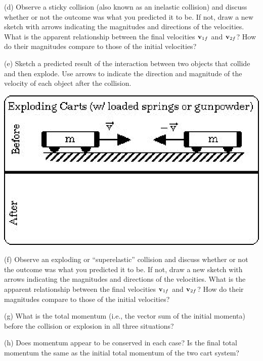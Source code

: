 (d) Observe a sticky collision (also known as an inelastic collision) and discuss
whether or not the outcome was what you predicted it to be. If not, draw a new
sketch with arrows indicating the magnitudes and directions of the velocities.
What is the apparent relationship between the final velocities \( {{\bf v}_{1f}} \)
and \( {{\bf v}_{2f}} \)? How do their magnitudes compare to those
of the initial velocities?
\vspace{20mm}

(e) Sketch a predicted result of the interaction between two objects that collide
and then explode. Use arrows to indicate the direction and magnitude of the
velocity of each object after the collision.

\vspace{0.3cm}
{\par\centering \includegraphics{mom_cons_fig5.eps} \par}
\vspace{0.3cm}

(f) Observe an exploding or ``superelastic'' collision and discuss
whether or not the outcome was what you predicted it to be. If not, draw a new
sketch with arrows indicating the magnitudes and directions of the velocities.
What is the apparent relationship between the final velocities \( {{\bf v}_{1f}} \)
and \( {{\bf v}_{2f}} \)? How do their magnitudes compare to those
of the initial velocities?
\vspace{20mm}

(g) What is the total momentum (i.e., the vector sum of the initial momenta)
before the collision or explosion in all three situations?
\vspace{20mm}

(h) Does momentum appear to be conserved in each case? Is the final total momentum
the same as the initial total momentum of the two cart system?
\vspace{20mm}

